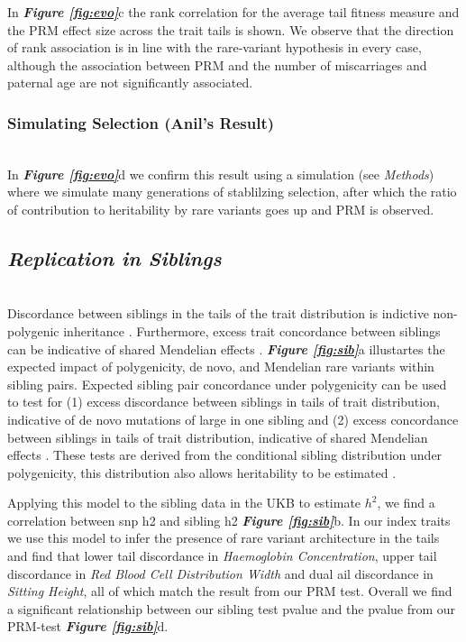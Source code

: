 \documentclass[times]{zHenriquesLab-StyleBioRxiv}
\newcommand\fref[1]{\normalsize{\textbf{\textit{Figure \ref{#1}}}}\normalsize{}}
\begin{document}
In \fref{fig:evo}{c} the rank correlation for the average tail fitness
measure and the PRM effect size across the trait tails is shown.  We
observe that the direction of rank association is in line with the
rare-variant hypothesis in every case, although the association
between PRM and the number of miscarriages and paternal age are not
significantly associated.


\subsubsection*{Simulating Selection (Anil's Result)} ~\\  
In \fref{fig:evo}{d} we confirm this result using a simulation (see \emph{Methods}) 
where we simulate many generations of stablilzing selection, after which the ratio 
of contribution to heritability by rare variants goes up and PRM is observed. 


\subsection*{\emph{Replication in Siblings}} ~\\
Discordance between siblings in the tails of the trait distribution is
indictive non-polygenic inheritance \cite{avi}. Furthermore, excess
trait concordance between siblings can be indicative of shared
Mendelian effects \cite{t_sibs}. \fref{fig:sib}{a} illustartes the
expected impact of polygenicity, de novo, and Mendelian rare variants
within sibling pairs. Expected sibling pair concordance under
polygenicity can be used to test for (1) excess discordance between
siblings in tails of trait distribution, indicative of de novo
mutations of large in one sibling and (2) excess concordance between
siblings in tails of trait distribution, indicative of shared
Mendelian effects \cite{t_sibs}. These tests are derived from the
conditional sibling distribution under polygenicity, this distribution
also allows heritability to be estimated \cite{t_sibs}.

Applying this model to the sibling data in the UKB to estimate $h^2$, 
we find a correlation between snp h2 and sibling h2 \fref{fig:sib}{b}.  
In our index traits we use this model to infer the presence of rare 
variant architecture in the tails and find that lower tail discordance 
in \emph{Haemoglobin Concentration}, upper tail discordance in 
\emph{Red Blood Cell Distribution Width} and dual ail discordance 
in \emph{Sitting Height}, all of which match the result from our PRM 
test.  Overall we find a significant relationship between our sibling 
test pvalue and the pvalue from our PRM-test \fref{fig:sib}{d}. 
\end{document}
